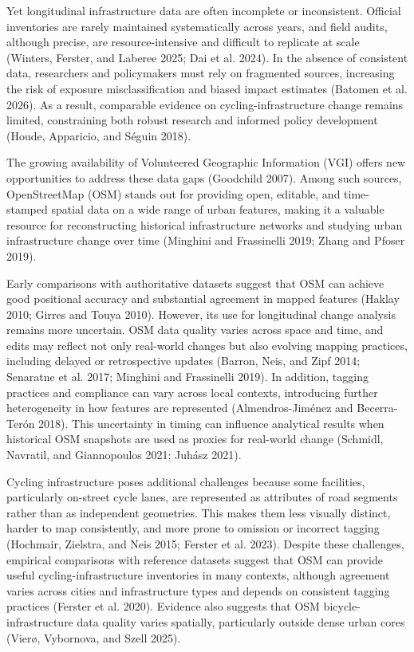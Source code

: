 \documentclass[
]{article}
\begin{document}
Yet longitudinal infrastructure data are often incomplete or
inconsistent. Official inventories are rarely maintained systematically
across years, and field audits, although precise, are resource-intensive
and difficult to replicate at scale (Winters, Ferster, and Laberee 2025;
Dai et al. 2024). In the absence of consistent data, researchers and
policymakers must rely on fragmented sources, increasing the risk of
exposure misclassification and biased impact estimates (Batomen et al.
2026). As a result, comparable evidence on cycling-infrastructure change
remains limited, constraining both robust research and informed policy
development (Houde, Apparicio, and Séguin 2018).

The growing availability of Volunteered Geographic Information (VGI)
offers new opportunities to address these data gaps (Goodchild 2007).
Among such sources, OpenStreetMap (OSM) stands out for providing open,
editable, and time-stamped spatial data on a wide range of urban
features, making it a valuable resource for reconstructing historical
infrastructure networks and studying urban infrastructure change over
time (Minghini and Frassinelli 2019; Zhang and Pfoser 2019).

Early comparisons with authoritative datasets suggest that OSM can
achieve good positional accuracy and substantial agreement in mapped
features (Haklay 2010; Girres and Touya 2010). However, its use for
longitudinal change analysis remains more uncertain. OSM data quality
varies across space and time, and edits may reflect not only real-world
changes but also evolving mapping practices, including delayed or
retrospective updates (Barron, Neis, and Zipf 2014; Senaratne et al.
2017; Minghini and Frassinelli 2019). In addition, tagging practices and
compliance can vary across local contexts, introducing further
heterogeneity in how features are represented (Almendros-Jiménez and
Becerra-Terón 2018). This uncertainty in timing can influence analytical
results when historical OSM snapshots are used as proxies for real-world
change (Schmidl, Navratil, and Giannopoulos 2021; Juhász 2021).

Cycling infrastructure poses additional challenges because some
facilities, particularly on-street cycle lanes, are represented as
attributes of road segments rather than as independent geometries. This
makes them less visually distinct, harder to map consistently, and more
prone to omission or incorrect tagging (Hochmair, Zielstra, and Neis
2015; Ferster et al. 2023). Despite these challenges, empirical
comparisons with reference datasets suggest that OSM can provide useful
cycling-infrastructure inventories in many contexts, although agreement
varies across cities and infrastructure types and depends on consistent
tagging practices (Ferster et al. 2020). Evidence also suggests that OSM
bicycle-infrastructure data quality varies spatially, particularly
outside dense urban cores (Vierø, Vybornova, and Szell 2025).
\end{document}
